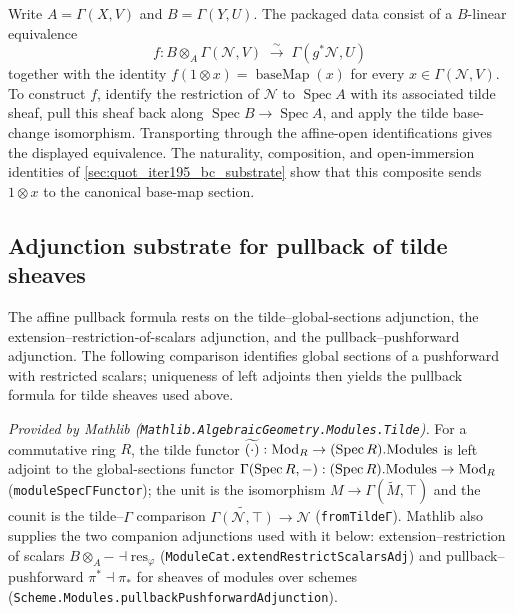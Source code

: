 \begin{definition}\leanok
  \label{def:pullback_app_isoTensor_sigma}
  Write \(A=\Gamma(X,V)\) and \(B=\Gamma(Y,U)\). The packaged data consist
  of a \(B\)-linear equivalence
  \[
    f : B\otimes_A\Gamma(\mathcal N,V)
      \;\xrightarrow{\sim}\; \Gamma(g^*\mathcal N,U)
  \]
  together with the identity
  \(f(1\otimes x)=\operatorname{baseMap}(x)\) for every
  \(x\in\Gamma(\mathcal N,V)\). To construct \(f\), identify the
  restriction of \(\mathcal N\) to \(\operatorname{Spec} A\) with its
  associated tilde sheaf, pull this sheaf back along
  \(\operatorname{Spec} B\to\operatorname{Spec} A\), and apply the tilde
  base-change isomorphism. Transporting through the affine-open
  identifications gives the displayed equivalence. The naturality,
  composition, and open-immersion identities of
  \cref{sec:quot_iter195_bc_substrate} show that this composite sends
  \(1\otimes x\) to the canonical base-map section.
\end{definition}

\subsection{Adjunction substrate for pullback of tilde sheaves}
\label{sec:quot_analogist_gaps}

The affine pullback formula rests on the tilde--global-sections adjunction,
the extension--restriction-of-scalars adjunction, and the
pullback--pushforward adjunction. The following comparison identifies global
sections of a pushforward with restricted scalars; uniqueness of left
adjoints then yields the pullback formula for tilde sheaves used above.

\begin{lemma}
  \label{lem:tilde_gamma_adjunction_mathlib}
  \mathlibok
  \textit{Provided by Mathlib (\texttt{Mathlib.AlgebraicGeometry.Modules.Tilde}).}
  For a commutative ring \(R\), the tilde functor
  \(\widetilde{(\cdot)} : \mathrm{Mod}_{R} \to (\operatorname{Spec} R).\mathrm{Modules}\)
  is left adjoint to the global-sections functor
  \(\Gamma(\operatorname{Spec} R, -) : (\operatorname{Spec} R).\mathrm{Modules} \to \mathrm{Mod}_{R}\)
  (\texttt{moduleSpecΓFunctor}); the unit is the isomorphism
  \(M \to \Gamma(\widetilde M, \top)\) and the counit is the
  tilde--\(\Gamma\) comparison
  \(\widetilde{\Gamma(\mathcal N, \top)} \to \mathcal N\)
  (\texttt{fromTildeΓ}). Mathlib also supplies the two companion
  adjunctions used with it below: extension--restriction of scalars
  \(B \otimes_A - \dashv \mathrm{res}_\varphi\)
  (\texttt{ModuleCat.extendRestrictScalarsAdj}) and
  pullback--pushforward \(\pi^* \dashv \pi_*\) for sheaves of modules
  over schemes (\texttt{Scheme.Modules.pullbackPushforwardAdjunction}).
\end{lemma}


